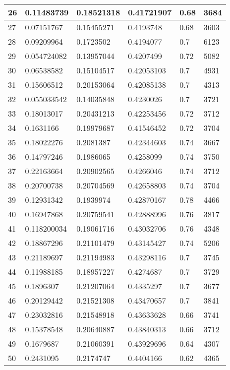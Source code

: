\begin{longtable}{|l|l|l|l|l|l|}
26 & 0.11483739 & 0.18521318 & 0.41721907 & 0.68 & 3684 \\ \hline 
27 & 0.07151767 & 0.15455271 & 0.4193748 & 0.68 & 3603 \\ \hline 
28 & 0.09209964 & 0.1723502 & 0.4194077 & 0.7 & 6123 \\ \hline 
29 & 0.054724082 & 0.13957044 & 0.4207499 & 0.72 & 5082 \\ \hline 
30 & 0.06538582 & 0.15104517 & 0.42053103 & 0.7 & 4931 \\ \hline 
31 & 0.15606512 & 0.20153064 & 0.42085138 & 0.7 & 4313 \\ \hline 
32 & 0.055033542 & 0.14035848 & 0.4230026 & 0.7 & 3721 \\ \hline 
33 & 0.18013017 & 0.20431213 & 0.42253456 & 0.72 & 3712 \\ \hline 
34 & 0.1631166 & 0.19979687 & 0.41546452 & 0.72 & 3704 \\ \hline 
35 & 0.18022276 & 0.2081387 & 0.42344603 & 0.74 & 3667 \\ \hline 
36 & 0.14797246 & 0.1986065 & 0.4258099 & 0.74 & 3750 \\ \hline 
37 & 0.22163664 & 0.20902565 & 0.4266046 & 0.74 & 3712 \\ \hline 
38 & 0.20700738 & 0.20704569 & 0.42658803 & 0.74 & 3704 \\ \hline 
39 & 0.12931342 & 0.1939974 & 0.42870167 & 0.78 & 4466 \\ \hline 
40 & 0.16947868 & 0.20759541 & 0.42888996 & 0.76 & 3817 \\ \hline 
41 & 0.118200034 & 0.19061716 & 0.43032706 & 0.76 & 4348 \\ \hline 
42 & 0.18867296 & 0.21101479 & 0.43145427 & 0.74 & 5206 \\ \hline 
43 & 0.21189697 & 0.21194983 & 0.43298116 & 0.7 & 3745 \\ \hline 
44 & 0.11988185 & 0.18957227 & 0.4274687 & 0.7 & 3729 \\ \hline 
45 & 0.1896307 & 0.21207064 & 0.4335297 & 0.7 & 3677 \\ \hline 
46 & 0.20129442 & 0.21521308 & 0.43470657 & 0.7 & 3841 \\ \hline 
47 & 0.23032816 & 0.21548918 & 0.43633628 & 0.66 & 3741 \\ \hline 
48 & 0.15378548 & 0.20640887 & 0.43840313 & 0.66 & 3712 \\ \hline 
49 & 0.1679687 & 0.21060391 & 0.43929696 & 0.64 & 4307 \\ \hline 
50 & 0.2431095 & 0.2174747 & 0.4404166 & 0.62 & 4365 \\ \hline 
\end{longtable}